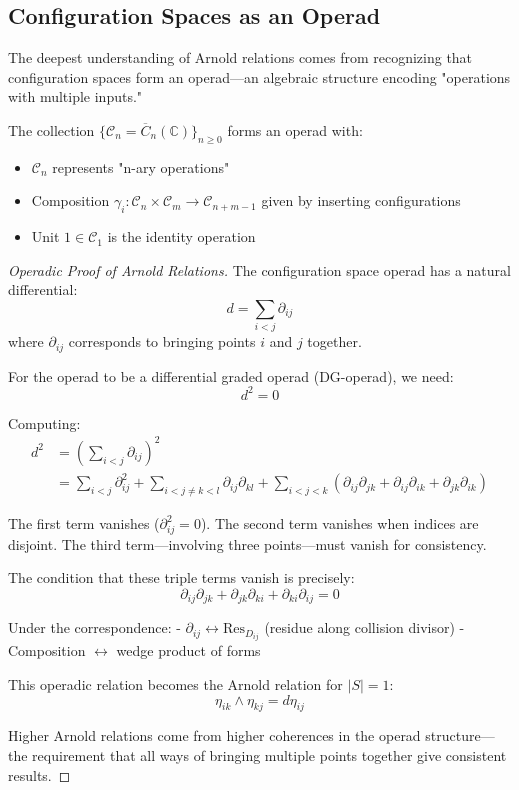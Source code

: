 \subsection{Configuration Spaces as an Operad}

The deepest understanding of Arnold relations comes from recognizing that configuration spaces form an operad—an algebraic structure encoding "operations with multiple inputs."

\begin{definition}
The collection $\{\mathcal{C}_n = \overline{C}_n(\mathbb{C})\}_{n \geq 0}$ forms an operad with:
\begin{itemize}
\item $\mathcal{C}_n$ represents "n-ary operations"
\item Composition $\gamma_i: \mathcal{C}_n \times \mathcal{C}_m \to \mathcal{C}_{n+m-1}$ given by inserting configurations
\item Unit $1 \in \mathcal{C}_1$ is the identity operation
\end{itemize}
\end{definition}

\begin{proof}[Operadic Proof of Arnold Relations]

The configuration space operad has a natural differential:
$$d = \sum_{i<j} \partial_{ij}$$
where $\partial_{ij}$ corresponds to bringing points $i$ and $j$ together.

For the operad to be a differential graded operad (DG-operad), we need:
$$d^2 = 0$$

Computing:
\begin{align}
d^2 &= \left(\sum_{i<j} \partial_{ij}\right)^2 \\
&= \sum_{i<j} \partial_{ij}^2 + \sum_{i<j \neq k<l} \partial_{ij} \partial_{kl} + \sum_{i<j<k} (\partial_{ij}\partial_{jk} + \partial_{ij}\partial_{ik} + \partial_{jk}\partial_{ik})
\end{align}

The first term vanishes ($\partial_{ij}^2 = 0$). The second term vanishes when indices are disjoint. The third term—involving three points—must vanish for consistency.

The condition that these triple terms vanish is precisely:
$$\partial_{ij}\partial_{jk} + \partial_{jk}\partial_{ki} + \partial_{ki}\partial_{ij} = 0$$

Under the correspondence:
- $\partial_{ij} \leftrightarrow \text{Res}_{D_{ij}}$ (residue along collision divisor)
- Composition $\leftrightarrow$ wedge product of forms

This operadic relation becomes the Arnold relation for $|S| = 1$:
$$\eta_{ik} \wedge \eta_{kj} = d\eta_{ij}$$

Higher Arnold relations come from higher coherences in the operad structure—the requirement that all ways of bringing multiple points together give consistent results.
\end{proof}

